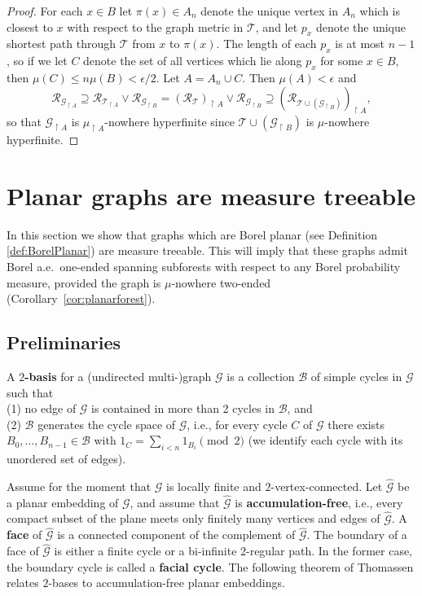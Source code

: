 \documentclass[11pt]{amsart}
\theoremstyle{definition}
\theoremstyle{plain}
\newcommand{\<}{\langle}
\renewcommand{\>}{\rangle}
\newcommand{\mc}[1]{\mathcal{#1}}
\newcommand{\wh}[1]{\widehat{#1}}
\newcommand{\Ggraph}{\mathcal{G}}
\newcommand{\Tgraph}{\mathcal{T}}
\newcommand{\define}[1]{\textbf{#1}}
\newcommand\RR{\mathscr{R}}
\begin{document}
\begin{proof}
For each $x\in B$ let $\pi (x)\in A_n$ denote the unique vertex in $A_n$ which is closest to $x$ with respect to the graph metric in $\Tgraph$, and let $p_x$ denote the unique shortest path through $\Tgraph$ from $x$ to $\pi (x)$. The length of each $p_x$ is at most $n-1$, so if we let $C$ denote the set of all vertices which lie along $p_x$ for some $x\in B$, then $\mu (C)\leq n\mu (B) < \epsilon /2$. Let $A=A_n\cup C$. Then $\mu (A)<\epsilon$ and
\[
\RR_{\Ggraph_{\restriction A}} \supseteq \RR_{\Tgraph_{\restriction A}} \vee \RR_{\Ggraph_{\restriction B}} =  (\RR_{\Tgraph})_{\restriction A} \vee \RR_{\Ggraph_{\restriction B}} \supseteq (\RR_{\Tgraph \cup (\Ggraph_{\restriction B})})_{\restriction A},
\]
so that $\Ggraph_{\restriction A}$ is $\mu _{\restriction A}$-nowhere hyperfinite since $\Tgraph \cup (\Ggraph_{\restriction B})$ is $\mu$-nowhere hyperfinite.
\end{proof}


\section{Planar graphs are measure treeable}\label{sec:planar}

In this section we show that graphs which are Borel planar (see Definition \ref{def:BorelPlanar}) are measure
treeable. This will imply that these graphs admit Borel a.e.\
one-ended spanning subforests with respect to any Borel probability
measure, provided the graph is $\mu$-nowhere two-ended (Corollary~\ref{cor:planarforest}).



\subsection{Preliminaries}\label{sect:Preliminaries}
A \define{$2$-basis} for a (undirected multi-)graph ${\Ggraph}$
is a collection $\mc{B}$ of simple cycles in ${\Ggraph}$ such that \\
(1) no
edge of ${\Ggraph}$ is contained in more than 2 cycles in $\mc{B}$, and
\\(2)
$\mc{B}$ generates the cycle space of ${\Ggraph}$, i.e., for every cycle
$C$ of ${\Ggraph}$ there exists $B_0,\dots, B_{n-1}\in \mc{B}$ with $1_C =
\sum _{i<n}1_{B_i} \pmod{2}$ (we identify each cycle with its unordered set of edges).

Assume for the moment that $\Ggraph$ is locally finite and $2$-vertex-connected.
Let $\wh{{\Ggraph}}$ be a planar embedding of ${\Ggraph}$,
and assume that $\wh{{\Ggraph}}$ is \define{accumulation-free}, i.e., every
compact subset of the plane meets only finitely many vertices and edges of
$\wh{{\Ggraph}}$. A \define{face} of $\wh{{\Ggraph}}$ is a connected component of the complement of $\wh{{\Ggraph}}$. The boundary of a face of $\wh{{\Ggraph}}$ is either a finite cycle or a bi-infinite 2-regular path.
 In the former case, the boundary cycle is called a \define{facial cycle}.
The following theorem of Thomassen relates $2$-bases to accumulation-free planar embeddings.
\end{document}
